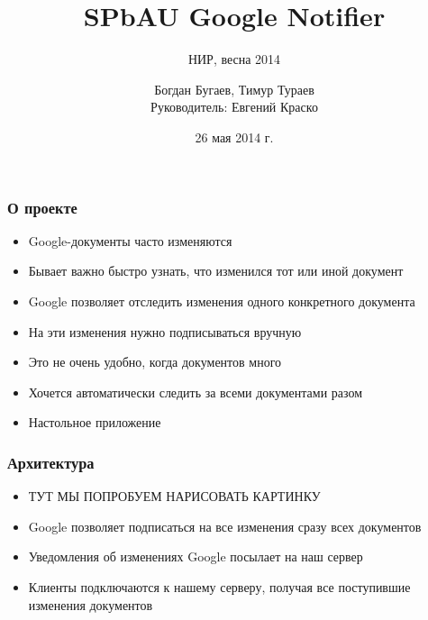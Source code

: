 \documentclass[10pt,pdf,hyperref={unicode}]{beamer}
\begin{document}
    \title[GoogleNotifier]{SPbAU Google Notifier}
    \subtitle{НИР, весна 2014}
    \author{Богдан Бугаев, Тимур Тураев \\ Руководитель: Евгений Краско}
    \date{26 мая 2014 г.}
    

    \begin{frame}
		\titlepage
	\end{frame}
    
    \begin{frame}\frametitle{О проекте}
        \begin{itemize}
        	\item	Google-документы часто изменяются
	       	\item	Бывает важно быстро узнать, что изменился тот или иной документ
	       	\pause
            \item	Google позволяет отследить изменения одного конкретного документа
            \pause
            \item	На эти изменения нужно подписываться вручную
            \pause            
            \item	Это не очень удобно, когда документов много
            \pause            
            \item	Хочется автоматически следить за всеми документами разом
            \pause            
            \item	Настольное приложение
        \end{itemize}
    \end{frame}    
    
    \begin{frame}\frametitle{Архитектура}
        \begin{itemize}%
            \item	ТУТ МЫ ПОПРОБУЕМ НАРИСОВАТЬ КАРТИНКУ
            \item	Google позволяет подписаться на все изменения сразу всех документов
            \pause
            \item   Уведомления об изменениях Google посылает на наш сервер
            \pause
            \item   Клиенты подключаются к нашему серверу, получая все поступившие изменения документов
        \end{itemize}
    \end{frame}
\end{document}
